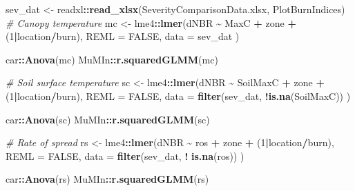 \documentclass[
]{article}
\newenvironment{Shaded}{\begin{snugshade}}{\end{snugshade}}
\newcommand{\AttributeTok}[1]{\textcolor[rgb]{0.13,0.29,0.53}{#1}}
\newcommand{\CommentTok}[1]{\textcolor[rgb]{0.56,0.35,0.01}{\textit{#1}}}
\newcommand{\ConstantTok}[1]{\textcolor[rgb]{0.56,0.35,0.01}{#1}}
\newcommand{\DecValTok}[1]{\textcolor[rgb]{0.00,0.00,0.81}{#1}}
\newcommand{\FunctionTok}[1]{\textcolor[rgb]{0.13,0.29,0.53}{\textbf{#1}}}
\newcommand{\NormalTok}[1]{#1}
\newcommand{\OtherTok}[1]{\textcolor[rgb]{0.56,0.35,0.01}{#1}}
\newcommand{\SpecialCharTok}[1]{\textcolor[rgb]{0.81,0.36,0.00}{\textbf{#1}}}
\newcommand{\StringTok}[1]{\textcolor[rgb]{0.31,0.60,0.02}{#1}}
\begin{document}
\begin{Shaded}
\begin{Highlighting}[]
\NormalTok{sev\_dat }\OtherTok{\textless{}{-}}\NormalTok{ readxl}\SpecialCharTok{::}\FunctionTok{read\_xlsx}\NormalTok{(}\StringTok{\textquotesingle{}SeverityComparisonData.xlsx\textquotesingle{}}\NormalTok{, }
                             \StringTok{\textquotesingle{}PlotBurnIndices\textquotesingle{}}\NormalTok{)}
\CommentTok{\# Canopy temperature}
\NormalTok{  mc }\OtherTok{\textless{}{-}}\NormalTok{ lme4}\SpecialCharTok{::}\FunctionTok{lmer}\NormalTok{(dNBR }\SpecialCharTok{\textasciitilde{}}\NormalTok{ MaxC }\SpecialCharTok{+}\NormalTok{ zone }\SpecialCharTok{+}\NormalTok{ (}\DecValTok{1}\SpecialCharTok{|}\NormalTok{location}\SpecialCharTok{/}\NormalTok{burn), }\AttributeTok{REML =} \ConstantTok{FALSE}\NormalTok{, }\AttributeTok{data =}\NormalTok{ sev\_dat )}

\NormalTok{    car}\SpecialCharTok{::}\FunctionTok{Anova}\NormalTok{(mc)}
\NormalTok{    MuMIn}\SpecialCharTok{::}\FunctionTok{r.squaredGLMM}\NormalTok{(mc)}

\CommentTok{\# Soil surface temperature}
\NormalTok{  sc }\OtherTok{\textless{}{-}}\NormalTok{ lme4}\SpecialCharTok{::}\FunctionTok{lmer}\NormalTok{(dNBR }\SpecialCharTok{\textasciitilde{}}\NormalTok{ SoilMaxC }\SpecialCharTok{+}\NormalTok{ zone }\SpecialCharTok{+}\NormalTok{ (}\DecValTok{1}\SpecialCharTok{|}\NormalTok{location}\SpecialCharTok{/}\NormalTok{burn), }\AttributeTok{REML =} \ConstantTok{FALSE}\NormalTok{, }
                     \AttributeTok{data =} \FunctionTok{filter}\NormalTok{(sev\_dat, }\SpecialCharTok{!}\FunctionTok{is.na}\NormalTok{(SoilMaxC)) )}
  
\NormalTok{  car}\SpecialCharTok{::}\FunctionTok{Anova}\NormalTok{(sc)}
\NormalTok{  MuMIn}\SpecialCharTok{::}\FunctionTok{r.squaredGLMM}\NormalTok{(sc)}

\CommentTok{\# Rate of spread}
\NormalTok{  rs }\OtherTok{\textless{}{-}}\NormalTok{ lme4}\SpecialCharTok{::}\FunctionTok{lmer}\NormalTok{(dNBR }\SpecialCharTok{\textasciitilde{}}\NormalTok{ ros }\SpecialCharTok{+}\NormalTok{ zone }\SpecialCharTok{+}\NormalTok{ (}\DecValTok{1}\SpecialCharTok{|}\NormalTok{location}\SpecialCharTok{/}\NormalTok{burn), }\AttributeTok{REML =} \ConstantTok{FALSE}\NormalTok{,  }
                     \AttributeTok{data =} \FunctionTok{filter}\NormalTok{(sev\_dat, }\SpecialCharTok{!} \FunctionTok{is.na}\NormalTok{(ros)) )}
  
\NormalTok{  car}\SpecialCharTok{::}\FunctionTok{Anova}\NormalTok{(rs)}
\NormalTok{  MuMIn}\SpecialCharTok{::}\FunctionTok{r.squaredGLMM}\NormalTok{(rs)}
\end{Highlighting}
\end{Shaded}
\end{document}
